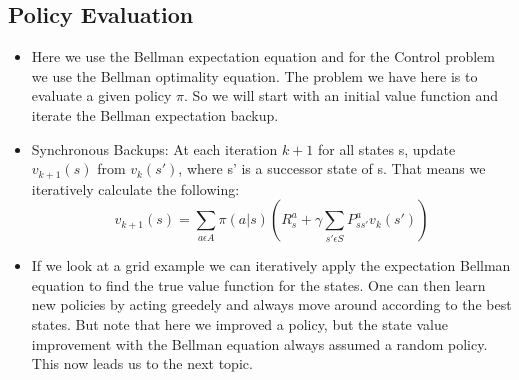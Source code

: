 \documentclass[a4paper]{article}
\begin{document}
\subsection{Policy Evaluation}
\begin{itemize}
    \item Here we use the Bellman expectation equation and for the Control problem we use the Bellman optimality equation. The problem we have here is to evaluate a given policy $\pi$. So we will start with an initial value function and iterate the Bellman expectation backup. 
    \item Synchronous Backups: At each iteration $k+1$ for all states s, update $v_{k+1}(s)$ from $v_k(s')$, where s' is a successor state of s. That means we iteratively calculate the following: 
    $$v_{k+1}(s) = \sum_{a \epsilon A} \pi (a|s)(R_s^a + \gamma \sum_{s' \epsilon S} P_{ss'}^a v_k(s'))$$
    \item If we look at a grid example we can iteratively apply the expectation Bellman equation to find the true value function for the states. One can then learn new policies by acting greedely and always move around according to the best states. But note that here we improved a policy, but the state value improvement with the Bellman equation always assumed a random policy. This now leads us to the next topic. 
\end{itemize}
\end{document}

